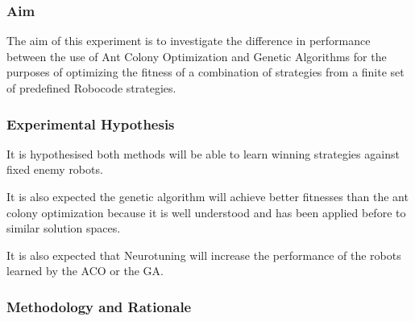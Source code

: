 \subsubsection{Aim}
The aim of this experiment is to investigate the difference in performance between the use of Ant Colony Optimization and Genetic Algorithms for the purposes of optimizing the fitness of a combination of strategies from a finite set of predefined Robocode strategies.

\subsubsection{Experimental Hypothesis}
It is hypothesised both methods will be able to  learn winning strategies against fixed enemy robots.

It is also expected the genetic algorithm will achieve better fitnesses than the ant colony optimization because it is well understood and has been applied before to similar solution spaces.

It is also expected that Neurotuning will increase the performance of the robots learned by the ACO or the GA.

\subsubsection{Methodology and Rationale}

